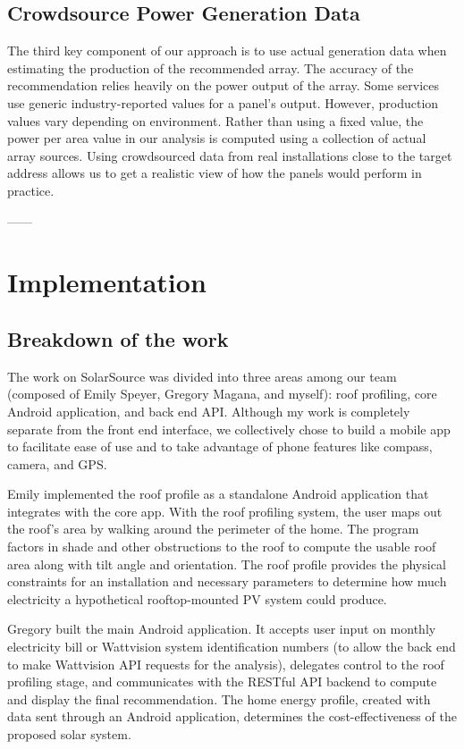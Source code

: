 \documentclass[pageno]{jpaper}
\begin{document}
\subsection{Crowdsource Power Generation Data}
The third key component of our approach is to use actual generation data when estimating the production of the recommended array. The accuracy of the recommendation relies heavily on the power output of the array. Some services use generic industry-reported values for a panel's output. However, production values vary depending on environment. Rather than using a fixed value, the power per area value in our analysis is computed using a collection of actual array sources. Using crowdsourced data from real installations close to the target address allows us to get a realistic view of how the panels would perform in practice.

------

\section{Implementation}
\subsection{Breakdown of the work}
The work on SolarSource was divided into three areas among our team (composed of Emily Speyer, Gregory Magana, and myself): roof profiling, core Android application, and back end API. Although my work is completely separate from the front end interface, we collectively chose to build a mobile app to facilitate ease of use and to take advantage of phone features like compass, camera, and GPS.

Emily implemented the roof profile as a standalone Android application that integrates with the core app. With the roof profiling system, the user maps out the roof's area by walking around the perimeter of the home. The program factors in shade and other obstructions to the roof to compute the usable roof area along with tilt angle and orientation. The roof profile provides the physical constraints for an installation and necessary parameters to determine how much electricity a hypothetical rooftop-mounted PV system could produce.

Gregory built the main Android application. It accepts user input on monthly electricity bill or Wattvision system identification numbers (to allow the back end to make Wattvision API requests for the analysis), delegates control to the roof profiling stage, and communicates with the RESTful API backend to compute and display the final recommendation. The home energy profile, created with data sent through an Android application, determines the cost-effectiveness of the proposed solar system. 
\end{document}
